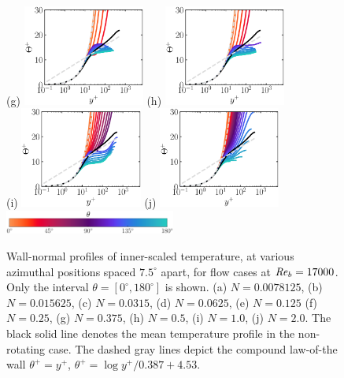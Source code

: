 \documentclass[lineno]{jfm}
\begin{document}
\begin{figure}
                (g) \includegraphics[width=4cm]{Figures/prof_ttplus_rotz0_roty0.1875.eps}
                (h) \includegraphics[width=4cm]{Figures/prof_ttplus_rotz0_roty0.25.eps} \\
                (i) \includegraphics[width=4cm]{Figures/prof_ttplus_rotz0_roty0.5.eps}
                (j) \includegraphics[width=4cm]{Figures/prof_ttplus_rotz0_roty1.0.eps} \\
                \includegraphics[width=0.5\textwidth]{Figures/theta_cmap.eps}
        \caption{
                Wall-normal profiles of
                inner-scaled temperature,
                at various azimuthal positions spaced
                $7.5^\circ$ apart,
                for flow cases at $\mbox{\textit{Re}}_b=17000$.
                Only the interval $\theta = [0^{\circ},180^{\circ}]$ is shown.
                (a) $N = 0.0078125$,
                (b) $N = 0.015625$,
                (c) $N = 0.0315$,
                (d) $N = 0.0625$,
                (e) $N = 0.125$
                (f) $N = 0.25$,
                (g) $N = 0.375$,
                (h) $N = 0.5$,
                (i) $N = 1.0$,
                (j) $N = 2.0$.
                The black solid line denotes the mean temperature profile in the
                non-rotating case.
                The dashed gray lines depict the compound law-of-the wall
		$\theta^{+}=y^+$, $\theta^{+}=\log y^+/0.387 + 4.53$.
        }
                \label{fig:tplus}
        \end{figure}
\end{document}
